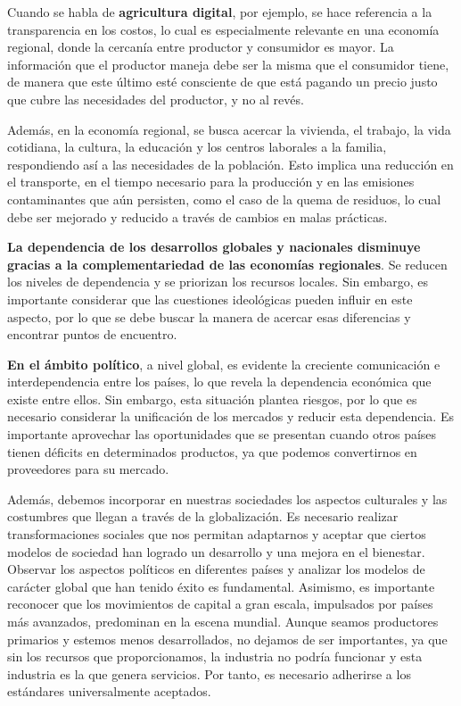 \documentclass[
  a4paper,
]{article}
\begin{document}
Cuando se habla de \textbf{agricultura digital}, por ejemplo, se hace
referencia a la transparencia en los costos, lo cual es especialmente
relevante en una economía regional, donde la cercanía entre productor y
consumidor es mayor. La información que el productor maneja debe ser la
misma que el consumidor tiene, de manera que este último esté consciente
de que está pagando un precio justo que cubre las necesidades del
productor, y no al revés.

Además, en la economía regional, se busca acercar la vivienda, el
trabajo, la vida cotidiana, la cultura, la educación y los centros
laborales a la familia, respondiendo así a las necesidades de la
población. Esto implica una reducción en el transporte, en el tiempo
necesario para la producción y en las emisiones contaminantes que aún
persisten, como el caso de la quema de residuos, lo cual debe ser
mejorado y reducido a través de cambios en malas prácticas.

\textbf{La dependencia de los desarrollos globales y nacionales
disminuye gracias a la complementariedad de las economías regionales}.
Se reducen los niveles de dependencia y se priorizan los recursos
locales. Sin embargo, es importante considerar que las cuestiones
ideológicas pueden influir en este aspecto, por lo que se debe buscar la
manera de acercar esas diferencias y encontrar puntos de encuentro.

\textbf{En el ámbito político}, a nivel global, es evidente la creciente
comunicación e interdependencia entre los países, lo que revela la
dependencia económica que existe entre ellos. Sin embargo, esta
situación plantea riesgos, por lo que es necesario considerar la
unificación de los mercados y reducir esta dependencia. Es importante
aprovechar las oportunidades que se presentan cuando otros países tienen
déficits en determinados productos, ya que podemos convertirnos en
proveedores para su mercado.

Además, debemos incorporar en nuestras sociedades los aspectos
culturales y las costumbres que llegan a través de la globalización. Es
necesario realizar transformaciones sociales que nos permitan adaptarnos
y aceptar que ciertos modelos de sociedad han logrado un desarrollo y
una mejora en el bienestar. Observar los aspectos políticos en
diferentes países y analizar los modelos de carácter global que han
tenido éxito es fundamental. Asimismo, es importante reconocer que los
movimientos de capital a gran escala, impulsados por países más
avanzados, predominan en la escena mundial. Aunque seamos productores
primarios y estemos menos desarrollados, no dejamos de ser importantes,
ya que sin los recursos que proporcionamos, la industria no podría
funcionar y esta industria es la que genera servicios. Por tanto, es
necesario adherirse a los estándares universalmente aceptados.
\end{document}
